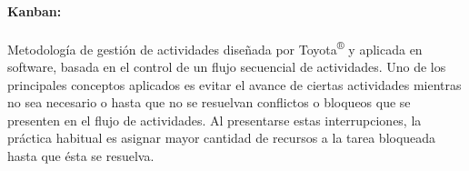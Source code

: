 \paragraph{Kanban:} Metodología de gestión de actividades diseñada por Toyota\textsuperscript{®} y aplicada en software, basada en el control de un flujo secuencial de actividades. Uno de los principales conceptos aplicados es evitar el avance de ciertas actividades mientras no sea necesario o hasta que no se resuelvan conflictos o bloqueos que se presenten en el flujo de actividades. Al presentarse estas interrupciones, la práctica habitual es asignar mayor cantidad de recursos a la tarea bloqueada hasta que ésta se resuelva.
